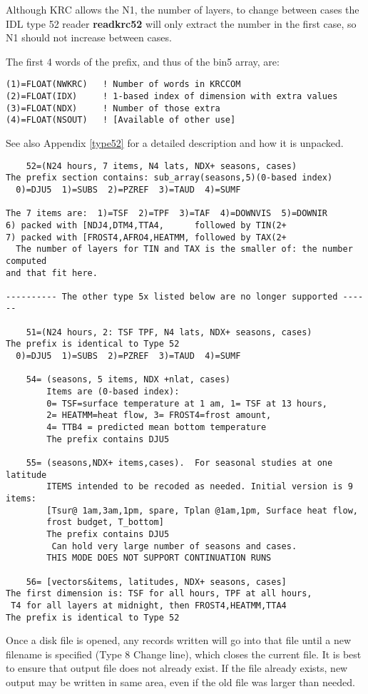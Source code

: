 \documentclass{article}
\newcommand{\np}{\textbf}  %
\begin{document}
Although KRC allows the N1, the number of layers, to change between cases the
IDL type 52 reader \np{readkrc52} will only extract the number in the first
case, so N1 should not increase between cases.

The first 4 words of the prefix, and thus of the bin5 array, are:
\vspace{-3.mm} 
\begin{verbatim}
(1)=FLOAT(NWKRC)   ! Number of words in KRCCOM
(2)=FLOAT(IDX)     ! 1-based index of dimension with extra values
(3)=FLOAT(NDX)     ! Number of those extra
(4)=FLOAT(NSOUT)   ! [Available of other use]
\end{verbatim}

See also Appendix \ref{type52} for a detailed description and how it is unpacked.

\vspace{-3.mm}
\begin{verbatim}
    52=(N24 hours, 7 items, N4 lats, NDX+ seasons, cases)
The prefix section contains: sub_array(seasons,5)(0-based index)
  0)=DJU5  1)=SUBS  2)=PZREF  3)=TAUD  4)=SUMF

The 7 items are:  1)=TSF  2)=TPF  3)=TAF  4)=DOWNVIS  5)=DOWNIR
6) packed with [NDJ4,DTM4,TTA4,      followed by TIN(2+
7) packed with [FROST4,AFRO4,HEATMM, followed by TAX(2+
  The number of layers for TIN and TAX is the smaller of: the number computed 
and that fit here.

---------- The other type 5x listed below are no longer supported ------

    51=(N24 hours, 2: TSF TPF, N4 lats, NDX+ seasons, cases)
The prefix is identical to Type 52
  0)=DJU5  1)=SUBS  2)=PZREF  3)=TAUD  4)=SUMF

    54= (seasons, 5 items, NDX +nlat, cases)
        Items are (0-based index): 
        0= TSF=surface temperature at 1 am, 1= TSF at 13 hours,
        2= HEATMM=heat flow, 3= FROST4=frost amount, 
        4= TTB4 = predicted mean bottom temperature
        The prefix contains DJU5 

    55= (seasons,NDX+ items,cases).  For seasonal studies at one latitude
        ITEMS intended to be recoded as needed. Initial version is 9 items:
        [Tsur@ 1am,3am,1pm, spare, Tplan @1am,1pm, Surface heat flow,
        frost budget, T_bottom]
        The prefix contains DJU5        
         Can hold very large number of seasons and cases. 
        THIS MODE DOES NOT SUPPORT CONTINUATION RUNS

    56= [vectors&items, latitudes, NDX+ seasons, cases]
The first dimension is: TSF for all hours, TPF at all hours, 
 T4 for all layers at midnight, then FROST4,HEATMM,TTA4
The prefix is identical to Type 52
\end{verbatim}
Once a disk file is opened, any records written will go into that file until a
new filename is specified (Type 8 Change line), which closes the current file.
It is best to ensure that output file does not already exist. If the file
already exists, new output may be written in same area, even if the old file was
larger than needed.
\end{document}
